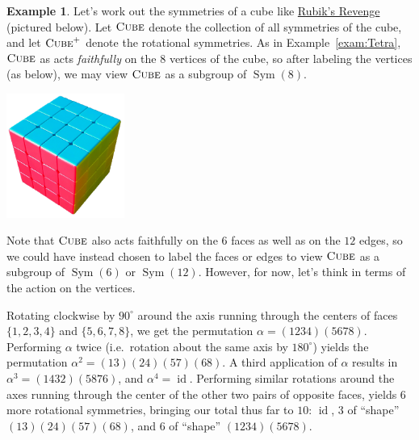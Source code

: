 \documentclass[11pt]{amsart}
\theoremstyle{plain}
\theoremstyle{definition}
\newtheorem{example}{Example}
\theoremstyle{remark}
\DeclareMathOperator{\Sym}{Sym}
\newcommand{\symcube}{\textsc{Cube}}
\newcommand{\rsymcube}{\textsc{Cube}^+}
\DeclareMathOperator{\id}{id}
\begin{document}
\begin{example}\label{exam:Cube}
Let's work out the symmetries of a cube like \href{https://en.wikipedia.org/wiki/Rubik\%27s_Revenge}{Rubik's Revenge} (pictured below). Let $\symcube$ denote the collection of all symmetries of the cube, and let $\rsymcube$ denote the rotational symmetries. As in Example~\ref{exam:Tetra}, $\symcube$ as acts \emph{faithfully} on the $8$ vertices of the cube, so after labeling the vertices (as below), we may view $\symcube$ as a subgroup of $\Sym(8)$. 

\begin{center}
\includegraphics[height=1.6in,angle =5,origin=c]{cube.png}
\hspace{0.75in}
\end{center}

Note that $\symcube$ also acts faithfully on the $6$ faces as well as on the $12$ edges, so we could have instead chosen to label the faces or edges to view $\symcube$ as a subgroup of $\Sym(6)$ or $\Sym(12)$. However, for now, let's think in terms of the action on the vertices.

Rotating clockwise by $90^\circ$ around the axis running through the centers of faces $\{1,2,3,4\}$ and $\{5,6,7,8\}$, we get the permutation $\alpha = (1234)(5678)$. Performing $\alpha$ twice (i.e.~rotation about the same axis by $180^\circ$) yields the permutation $\alpha^2 = (13)(24)(57)(68)$. A third application of $\alpha$ results in $\alpha^3 = (1432)(5876)$, and  $\alpha^4 = \id$. Performing similar rotations around the axes running through the center of the other two pairs of opposite faces, yields $6$ more rotational symmetries, bringing our total thus far to $10$: $\id$, $3$ of ``shape'' $(13)(24)(57)(68)$, and $6$ of ``shape'' $(1234)(5678)$.


\end{example}
\end{document}
